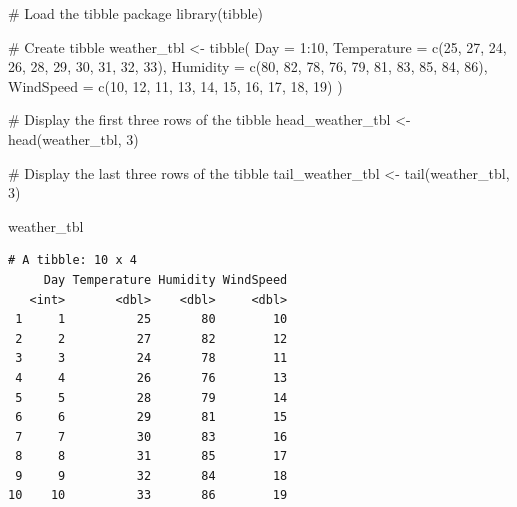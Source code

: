 \documentclass[
  letterpaper,
  DIV=11,
  numbers=noendperiod]{scrreprt}
\newenvironment{Shaded}{\begin{snugshade}}{\end{snugshade}}
\newcommand{\AttributeTok}[1]{\textcolor[rgb]{0.40,0.45,0.13}{#1}}
\newcommand{\CommentTok}[1]{\textcolor[rgb]{0.37,0.37,0.37}{#1}}
\newcommand{\DecValTok}[1]{\textcolor[rgb]{0.68,0.00,0.00}{#1}}
\newcommand{\FunctionTok}[1]{\textcolor[rgb]{0.28,0.35,0.67}{#1}}
\newcommand{\NormalTok}[1]{\textcolor[rgb]{0.00,0.23,0.31}{#1}}
\newcommand{\OtherTok}[1]{\textcolor[rgb]{0.00,0.23,0.31}{#1}}
\newcommand{\SpecialCharTok}[1]{\textcolor[rgb]{0.37,0.37,0.37}{#1}}
\begin{document}
\begin{Shaded}
\begin{Highlighting}[]
\CommentTok{\# Load the tibble package}
\FunctionTok{library}\NormalTok{(tibble)}

\CommentTok{\# Create tibble}
\NormalTok{weather\_tbl }\OtherTok{\textless{}{-}} \FunctionTok{tibble}\NormalTok{(}
  \AttributeTok{Day =} \DecValTok{1}\SpecialCharTok{:}\DecValTok{10}\NormalTok{,}
  \AttributeTok{Temperature =} \FunctionTok{c}\NormalTok{(}\DecValTok{25}\NormalTok{, }\DecValTok{27}\NormalTok{, }\DecValTok{24}\NormalTok{, }\DecValTok{26}\NormalTok{, }\DecValTok{28}\NormalTok{, }\DecValTok{29}\NormalTok{, }\DecValTok{30}\NormalTok{, }\DecValTok{31}\NormalTok{, }\DecValTok{32}\NormalTok{, }\DecValTok{33}\NormalTok{),}
  \AttributeTok{Humidity =} \FunctionTok{c}\NormalTok{(}\DecValTok{80}\NormalTok{, }\DecValTok{82}\NormalTok{, }\DecValTok{78}\NormalTok{, }\DecValTok{76}\NormalTok{, }\DecValTok{79}\NormalTok{, }\DecValTok{81}\NormalTok{, }\DecValTok{83}\NormalTok{, }\DecValTok{85}\NormalTok{, }\DecValTok{84}\NormalTok{, }\DecValTok{86}\NormalTok{),}
  \AttributeTok{WindSpeed =} \FunctionTok{c}\NormalTok{(}\DecValTok{10}\NormalTok{, }\DecValTok{12}\NormalTok{, }\DecValTok{11}\NormalTok{, }\DecValTok{13}\NormalTok{, }\DecValTok{14}\NormalTok{, }\DecValTok{15}\NormalTok{, }\DecValTok{16}\NormalTok{, }\DecValTok{17}\NormalTok{, }\DecValTok{18}\NormalTok{, }\DecValTok{19}\NormalTok{)}
\NormalTok{)}

\CommentTok{\# Display the first three rows of the tibble}
\NormalTok{head\_weather\_tbl }\OtherTok{\textless{}{-}} \FunctionTok{head}\NormalTok{(weather\_tbl, }\DecValTok{3}\NormalTok{)}

\CommentTok{\# Display the last three rows of the tibble}
\NormalTok{tail\_weather\_tbl }\OtherTok{\textless{}{-}} \FunctionTok{tail}\NormalTok{(weather\_tbl, }\DecValTok{3}\NormalTok{)}

\NormalTok{weather\_tbl}
\end{Highlighting}
\end{Shaded}

\begin{verbatim}
# A tibble: 10 x 4
     Day Temperature Humidity WindSpeed
   <int>       <dbl>    <dbl>     <dbl>
 1     1          25       80        10
 2     2          27       82        12
 3     3          24       78        11
 4     4          26       76        13
 5     5          28       79        14
 6     6          29       81        15
 7     7          30       83        16
 8     8          31       85        17
 9     9          32       84        18
10    10          33       86        19
\end{verbatim}
\end{document}
